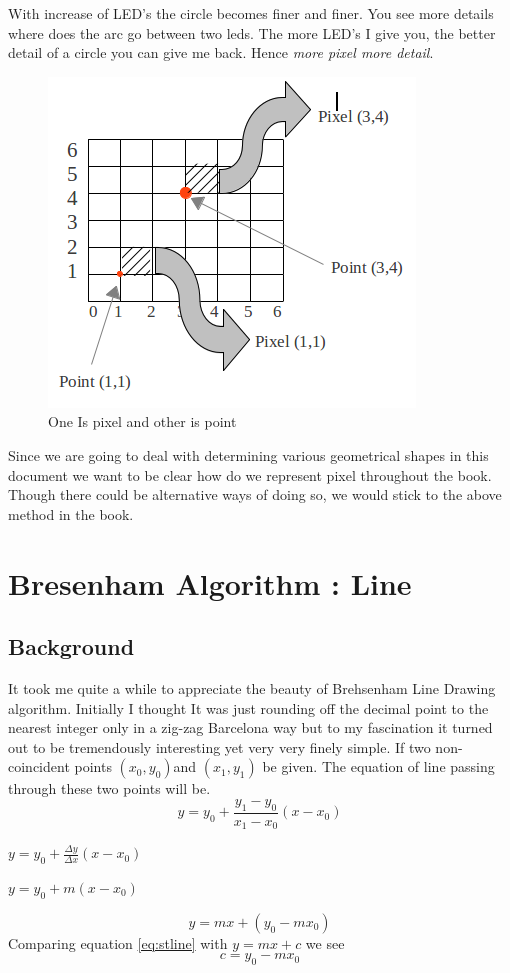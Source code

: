 \documentclass[a4paper,12pt,oneside]{book}
\begin{document}
\quad With increase of LED's the circle becomes finer and finer. You see more details where does the arc go between two leds. The more LED's I give you, the  better detail of a circle you can give me back. Hence \emph{more pixel more detail}.\\ \begin{figure}[hbtp]
\caption{One Is pixel and other is point}
\centering
\includegraphics[scale=.8]{Files/Images/PixelAndPoint.png}
\end{figure}

Since we are going to deal with determining various geometrical shapes in this document we want to be clear how do we represent pixel throughout the book. Though there could be alternative ways of doing so, we would stick to the above method in the book.

\chapter{Bresenham Algorithm : Line}
\section{Background}
It took me quite a while to appreciate the beauty of Brehsenham Line Drawing algorithm. Initially I thought It was just rounding off the decimal point to the nearest integer only in a zig-zag Barcelona way but to my fascination it turned out to be tremendously interesting yet very very finely simple.
 If two non-coincident points $(x_0,y_0)$and $(x_1,y_1)$ be given. The equation of line passing through these two points will be.
\begin{equation} \label{eq:basiceq}
	y=y_0+\frac{y_1-y_0}{x_1-x_0} (x-x_0)
\end{equation}
\begin{center}
	$y=y_0+\frac{\Delta y}{\Delta x} (x-x_0)$
\end{center}
\begin{center}
	$y=y_0+m (x-x_0)$
\end{center}
\begin{equation} \label{eq:stline}
	y=mx+ (y_0 -mx_0)
\end{equation}
Comparing equation \ref{eq:stline} with $y=mx+c$ we see
\begin{equation} \label{eq:valueofc}
	c=y_0-mx_0
\end{equation}
\end{document}
